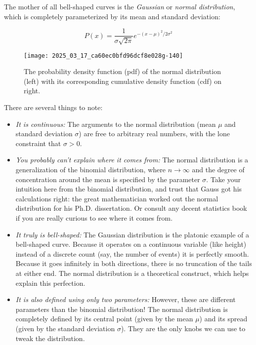 \documentclass[10pt]{article}
\begin{document}
The mother of all bell-shaped curves is the \textit{Gaussian} or \textit{normal distribution}, which is completely parameterized by its mean and standard deviation:

\[
P(x)=\frac{1}{\sigma \sqrt{2 \pi}} e^{-(x-\mu)^{2} / 2 \sigma^{2}}
\]

\begin{figure}
\centering
\texttt{[image: 2025\_03\_17\_ca60ec0bfd96dcf8e028g-140]}
\caption{The probability density function (pdf) of the normal distribution (left) with its corresponding cumulative density function (cdf) on right.}
\end{figure} 

There are several things to note:

\begin{itemize}
  \item \textit{It is continuous:} The arguments to the normal distribution (mean $\mu$ and standard deviation $\sigma$) are free to arbitrary real numbers, with the lone constraint that $\sigma>0$.
  \item \textit{You probably can't explain where it comes from:} The normal distribution is a generalization of the binomial distribution, where $n \rightarrow \infty$ and the degree of concentration around the mean is specified by the parameter $\sigma$. Take your intuition here from the binomial distribution, and trust that Gauss got his calculations right: the great mathematician worked out the normal distribution for his Ph.D. dissertation. Or consult any decent statistics book if you are really curious to see where it comes from.
  \item \textit{It truly is bell-shaped:} The Gaussian distribution is the platonic example of a bell-shaped curve. Because it operates on a continuous variable (like height) instead of a discrete count (say, the number of events) it is perfectly smooth. Because it goes infinitely in both directions, there is no truncation of the tails at either end. The normal distribution is a theoretical construct, which helps explain this perfection.
  \item \textit{It is also defined using only two parameters:} However, these are different parameters than the binomial distribution! The normal distribution is completely defined by its central point (given by the mean $\mu$) and its spread (given by the standard deviation $\sigma$). They are the only knobs we can use to tweak the distribution.
\end{itemize}
\end{document}
